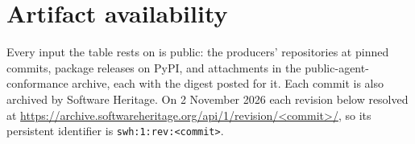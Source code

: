 \providecommand{\aevmsg}[2]{\href{https://lists.w3.org/Archives/Public/public-agent-conformance/2026#1/#2.html}{#1/#2}}
\providecommand{\aevreadrelease}{0.32.1}

\section{Artifact availability}
\label{sec:w3c-availability}

Every input the table rests on is public: the producers' repositories at pinned commits, package releases on PyPI, and attachments in the public-agent-conformance archive, each with the digest posted for it. Each commit is also archived by Software Heritage. On 2 November 2026 each revision below resolved at \url{https://archive.softwareheritage.org/api/1/revision/<commit>/}, so its persistent identifier is \texttt{swh:1:rev:<commit>}.

